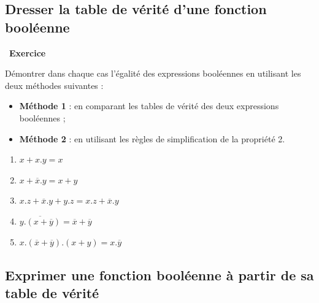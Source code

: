 \documentclass[
  11pt,
]{article}
\providecommand{\tightlist}{%
  \setlength{\itemsep}{0pt}\setlength{\parskip}{0pt}}
\newcounter{exo}
\newenvironment{exercice}[1]
{\par \medskip   \addtocounter{exo}{1} \noindent  
\begin{bclogo}[arrondi =0.1,   noborder = true, logo=\bccrayon, marge=4]{~\textbf{Exercice} \textbf{\theexo} {\itshape #1} }  \par}
{
\end{bclogo}
 \par \bigskip }
\newcounter{prop}
\newcounter{def}
\begin{document}
\hypertarget{dresser-la-table-de-vuxe9rituxe9-dune-fonction-booluxe9enne}{%
\subsection{Dresser la table de vérité d'une fonction
booléenne}\label{dresser-la-table-de-vuxe9rituxe9-dune-fonction-booluxe9enne}}

\begin{exercice}{}

Démontrer dans chaque cas l'égalité des expressions booléennes en
utilisant les deux méthodes suivantes :

\begin{itemize}
\item
  \textbf{Méthode 1} : en comparant les tables de vérité des deux
  expressions booléennes ;
\item
  \textbf{Méthode 2} : en utilisant les règles de simplification de la
  propriété 2.
\end{itemize}

\begin{enumerate}
\def\labelenumi{\arabic{enumi}.}
\tightlist
\item
  \(x + x . y = x\)
\item
  \(x + \overline{x} . y= x + y\)
\item
  \(x . z + \overline{x} . y + y . z = x . z + \overline{x} . y\)
\item
  \(\overline{y . (x + \overline{y})} = \overline{x} + \overline{y}\)
\item
  \(x . ( \overline{x} + \overline{y}) . (x + y) = x . \overline{y}\)
\end{enumerate}

\end{exercice}

\hypertarget{exprimer-une-fonction-booluxe9enne-uxe0-partir-de-sa-table-de-vuxe9rituxe9}{%
\subsection{Exprimer une fonction booléenne à partir de sa table de
vérité}\label{exprimer-une-fonction-booluxe9enne-uxe0-partir-de-sa-table-de-vuxe9rituxe9}}
\end{document}
